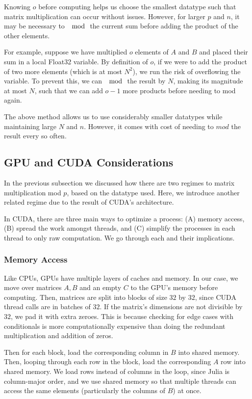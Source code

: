 Knowing $o$ before computing helps us choose the smallest datatype such that matrix multiplication can occur without issues. However, for larger $p$ and $n$, it may be necessary to $\mod$ the current sum before adding the product of the other elements. 

For example, suppose we have multiplied $o$ elements of $A$ and $B$ and placed their sum in a local Float32 variable. By definition of $o$, if we were to add the product of two more elements (which is at most $N^2$), we run the risk of overflowing the variable. To prevent this, we can $\mod$ the result by $N$, making its magnitude at most $N$, such that we can add $o-1$ more products before needing to mod again.

The above method allows us to use considerably smaller datatypes while maintaining large $N$ and $n$. However, it comes with cost of needing to $mod$ the result every so often.

\subsection{GPU and CUDA Considerations}

In the previous subsection we discussed how there are two regimes to matrix multiplication mod $p$, based on the datatype used. Here, we introduce another related regime due to the result of CUDA's architecture.

In CUDA, there are three main ways to optimize a process: (A) memory access, (B) spread the work amongst threads, and (C) simplify the processes in each thread to only raw computation. We go through each and their implications.

\subsubsection{Memory Access}

Like CPUs, GPUs have multiple layers of caches and memory. In our case, we move over matrices $A, B$ and an empty $C$ to the GPU's memory before computing. Then, matrices are split into blocks of size $32$ by $32$, since CUDA thread calls are in batches of $32$. If the matrix's dimensions are not divisible by $32$, we pad it with extra zeroes. This is because checking for edge cases with conditionals is more computationally expensive than doing the redundant multiplication and addition of zeros.

Then for each block, load the corresponding column in $B$ into shared memory. Then, looping through each row in the block, load the corresponding $A$ row into shared memory. We load rows instead of columns in the loop, since Julia is column-major order, and we use shared memory so that multiple threads can access the same elements (particularly the columns of $B$) at once.

